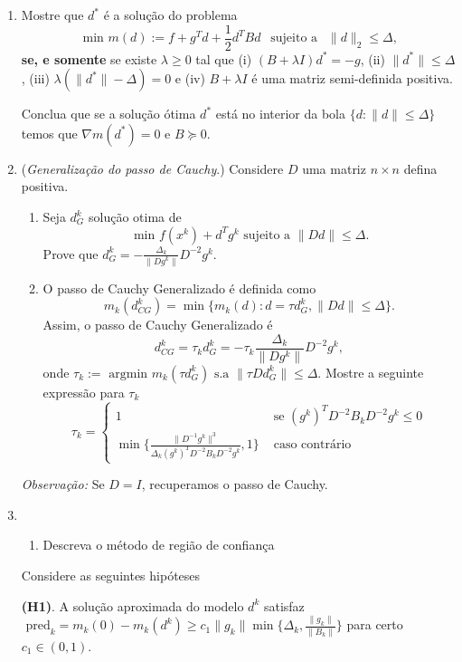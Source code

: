 \documentclass[a4paper,latin]{article}
\begin{document}
\begin{enumerate}
    {\bf MÉTODO DE REGIÃO DE CONFIANÇA}
  
    \item Mostre que $d^{*}$ é a solução do problema 
    $$
    \text{ min } m(d):=f+g^{T}d+\frac{1}{2} d^{T}Bd 
    \ \ \text{ sujeito a } \ \ 
    \|d\|_2 \leq \Delta, $$
    {\bf se, e somente} se existe $\lambda\geq 0$ tal que 
    (i) $(B+\lambda I)d^{*}=-g$, (ii) $\|d^{*}\|\leq \Delta$, 
    (iii) $\lambda(\|d^*\|-\Delta)=0$ e (iv) $B+\lambda I$ é 
    uma matriz semi-definida positiva. 
    
    Conclua que se a solução ótima $d^{*}$ está no interior da bola $\{d:\|d\|\leq \Delta\}$ temos que $\nabla m(d^*)=0$ e $B \succeq 0$.
     \item ({\it Generalização do passo de Cauchy}.) Considere 
    $D$ uma matriz $n \times n$ defina positiva.
    \begin{enumerate}
    	\item Seja $d_{G}^{k}$ solução otima de 
    	$$ \text{ min } f(x^k)+ d^{T}g^{k} 
    	\text{ sujeito a } \|Dd\|\leq \Delta. $$
    	Prove que $d_{G}^{k}= -\frac{\Delta_k}{\|Dg^{k}\|} D^{-2}g^{k}$.
    	\item O passo de Cauchy Generalizado é definida como
    	$$ m_{k}(d_{CG}^{k})= \min \{ m_{k}(d): 
    	d=\tau d_{G}^{k}, \|D d\|\leq \Delta  
    	\}. $$
    	Assim, o passo de Cauchy Generalizado é
    	$$  d_{CG}^{k}=\tau_{k}d_{G}^{k}=-\tau_k \frac{\Delta_k}{\|Dg^{k}\|} D^{-2}g^{k},  $$                        
    	onde $\tau_{k}:=\text{ argmin } 
    	m_{k}(\tau d_{G}^{k}) \text{ s.a } \|\tau Dd_{G}^{k}\|\leq \Delta$.
    	Mostre a seguinte expressão para $\tau_{k}$
    	$$
    	\tau_{k}=
    	\left\{
    	\begin{matrix}
    	1 & \text{ se } (g^{k})^{T}D^{-2}B_{k}D^{-2}g^{k}\leq 0 \\
    	\min  \{ \frac{\|D^{-1}g^{k}\|^{3}}{\Delta_{k}(g^{k})^{T}D^{-2}B_{k}D^{-2}g^{k}}, 1\} & \text{ caso contrário }
    	\end{matrix}
    	\right.	  
    	$$ 
    \end{enumerate}
    {\it Observação: } Se $D=I$, recuperamos o passo de Cauchy.	   
    \item \begin{enumerate}
    	\item Descreva o método de região de confiança
    \end{enumerate}
    Considere as seguintes hipóteses
    
    {\bf (H1)}. A solução aproximada do modelo $d^{k}$
    satisfaz 
    $ 
    \text{ pred}_{k}=m_{k}(0)-m_{k}(d^{k}) \geq 
    c_1 \|g_k\|
    \min \{ \Delta_k, \frac{\|g_{k}\|}{\|B_k\|} \}
    $ para certo $c_1 \in (0,1)$.
    

\end{enumerate}
\end{document}
